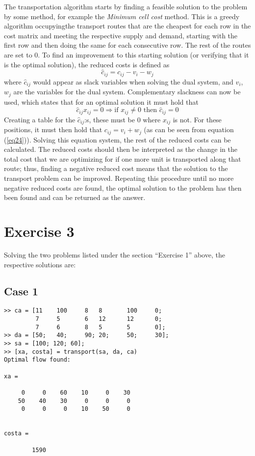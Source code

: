 \documentclass{article}
\begin{document}
  \noindent
  The transportation algorithm starts by finding a feasible solution to the
  problem by some method, for example the \textit{Minimum cell cost}
  method. This is a greedy algorithm occupying\q the
  transport routes that are the cheapest for each row in the cost matrix and
  meeting the respective supply and demand, starting with the first row and
  then doing the same for each consecutive row. The rest of the routes are set
  to 0.  To find an improvement to this starting solution (or verifying that it
  is the optimal solution), the reduced costs is defined as
  \begin{equation}
    \hat{c}_{ij} = c_{ij} - v_i - w_j
    \label{eq24}
  \end{equation}
  where $\hat{c}_{ij}$ would appear as slack variables when solving the dual
  system, and $v_i$, $w_j$ are the variables for the dual system.
  Complementary slackness can now be used, which states that for an optimal
  solution it must hold that
  \begin{equation}
    \hat{c}_{ij}x_{ij} = 0 \Rightarrow \text{if } x_{ij} \neq 0 \text{ then } \hat{c}_{ij} = 0
  \end{equation}
  Creating a table for the $\hat{c}_{ij}$:s, these must be 0 where $x_{ij}$ is
  not. For these positions, it must then hold that $c_{ij} = v_i + w_j$ (as can
  be seen from equation (\ref{eq24})). Solving this equation system, the rest
  of the reduced costs can be calculated. The reduced costs should then be
  interpreted as the change in the total cost that we are optimizing for if one
  more unit is transported along that route; thus, finding a negative reduced
  cost means that the solution to the transport problem can be improved.
  Repeating this procedure until no more negative reduced costs are found, the
  optimal solution to the problem has then been found and can be returned as
  the answer.

  \section*{Exercise 3}
  Solving the two problems listed under the section ``Exercise 1'' above, the
  respective solutions are:

  \subsection*{Case 1}
  \begin{lstlisting}
>> ca = [11    100     8   8       100     0;
         7     5       6   12      12      0;
         7     6       8   5       5       0];
>> da = [50;   40;     90; 20;     50;     30];
>> sa = [100; 120; 60];
>> [xa, costa] = transport(sa, da, ca)
Optimal flow found:

xa =

     0     0    60    10     0    30
    50    40    30     0     0     0
     0     0     0    10    50     0


costa =

        1590
  \end{lstlisting}
\end{document}
